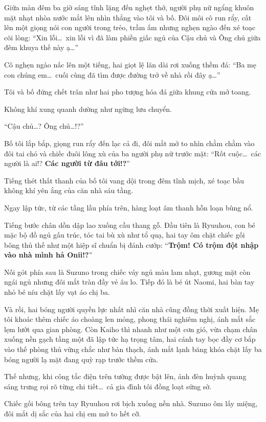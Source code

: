 \documentclass[../main.tex]{subfiles}
\begin{document}
Giữa màn đêm ba giờ sáng tĩnh lặng đến nghẹt thở, người phụ nữ ngẩng khuôn mặt nhạt nhòa nước mắt lên nhìn thẳng vào tôi và bố. Đôi môi cô run rẩy, cất lên một giọng nói con người trong trẻo, trầm ấm nhưng nghẹn ngào đến xé toạc cõi lòng: ``Xin lỗi\dots\ xin lỗi vì đã làm phiền giấc ngủ của Cậu chủ và Ông chủ giữa đêm khuya thế này ạ\dots''

Cô nghẹn ngào nấc lên một tiếng, hai giọt lệ lăn dài rơi xuống thềm đá: ``Ba mẹ con chúng em\dots\ cuối cùng đã tìm được đường trở về nhà rồi đây ạ\dots''

Tôi và bố đứng chết trân như hai pho tượng hóa đá giữa khung cửa mở toang.

Không khí xung quanh dường như ngừng lưu chuyển.

``Cậu chủ\dots? Ông chủ\dots!?''

Bố tôi lắp bắp, giọng run rẩy đến lạc cả đi, đôi mắt mở to nhìn chằm chằm vào đôi tai chó và chiếc đuôi lông xù của ba người phụ nữ trước mặt: ``Rốt cuộc\dots\ các người là ai!? \textbf{Các người từ đâu tới!?}''

Tiếng thét thất thanh của bố tôi vang dội trong đêm tĩnh mịch, xé toạc bầu không khí yên ắng của căn nhà sáu tầng.

Ngay lập tức, từ các tầng lầu phía trên, hàng loạt âm thanh hỗn loạn bùng nổ.

Tiếng bước chân dồn dập lao xuống cầu thang gỗ. Đầu tiên là Ryuuhou, con bé mặc bộ đồ ngủ gấu trúc, tóc tai bù xù như tổ quạ, hai tay ôm chặt chiếc gối bông thủ thế như một hiệp sĩ chuẩn bị đánh cướp: ``\textbf{Trộm! Có trộm đột nhập vào nhà mình hả Onii!?}''

Nối gót phía sau là Suzuno trong chiếc váy ngủ màu lam nhạt, gương mặt còn ngái ngủ nhưng đôi mắt tràn đầy vẻ âu lo. Tiếp đó là bé út Naomi, hai bàn tay nhỏ bé níu chặt lấy vạt áo chị ba.

Và rồi, hai bóng người quyền lực nhất nhì căn nhà cũng đồng thời xuất hiện. Mẹ tôi khoác thêm chiếc áo choàng len mỏng, phong thái nghiêm nghị, ánh mắt sắc lẹm lướt qua gian phòng. Còn Kaiho thì nhanh như một cơn gió, vừa chạm chân xuống nền gạch tầng một đã lập tức hạ trọng tâm, hai cánh tay bọc đầy cơ bắp vào thế phòng thủ vững chắc như bàn thạch, ánh mắt lạnh băng khóa chặt lấy ba bóng người lạ mặt đang quỳ rạp trước thềm cửa.

Thế nhưng, khi công tắc điện trên tường được bật lên, ánh đèn huỳnh quang sáng trưng rọi rõ từng chi tiết\dots\ cả gia đình tôi đồng loạt sững sờ.

Chiếc gối bông trên tay Ryuuhou rơi bịch xuống nền nhà. Suzuno ôm lấy miệng, đôi mắt dị sắc của hai chị em mở to hết cỡ.
\end{document}

